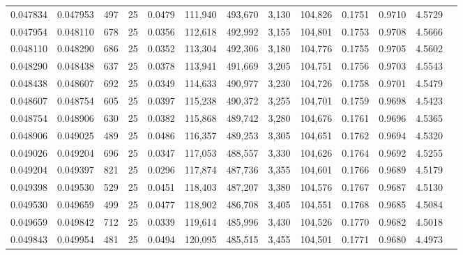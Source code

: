 \begin{tabular}{rrrrrrrrrrrrr}
0.047834 & 0.047953 &   497 &  25 &                                     0.0479 & 111,940 & 493,670 &   3,130 & 104,826 & 0.1751 & 0.9710 & 4.5729 \\
0.047954 & 0.048110 &   678 &  25 &                                     0.0356 & 112,618 & 492,992 &   3,155 & 104,801 & 0.1753 & 0.9708 & 4.5666 \\
0.048110 & 0.048290 &   686 &  25 &                                     0.0352 & 113,304 & 492,306 &   3,180 & 104,776 & 0.1755 & 0.9705 & 4.5602 \\
0.048290 & 0.048438 &   637 &  25 &                                     0.0378 & 113,941 & 491,669 &   3,205 & 104,751 & 0.1756 & 0.9703 & 4.5543 \\
0.048438 & 0.048607 &   692 &  25 &                                     0.0349 & 114,633 & 490,977 &   3,230 & 104,726 & 0.1758 & 0.9701 & 4.5479 \\
0.048607 & 0.048754 &   605 &  25 &                                     0.0397 & 115,238 & 490,372 &   3,255 & 104,701 & 0.1759 & 0.9698 & 4.5423 \\
0.048754 & 0.048906 &   630 &  25 &                                     0.0382 & 115,868 & 489,742 &   3,280 & 104,676 & 0.1761 & 0.9696 & 4.5365 \\
0.048906 & 0.049025 &   489 &  25 &                                     0.0486 & 116,357 & 489,253 &   3,305 & 104,651 & 0.1762 & 0.9694 & 4.5320 \\
0.049026 & 0.049204 &   696 &  25 &                                     0.0347 & 117,053 & 488,557 &   3,330 & 104,626 & 0.1764 & 0.9692 & 4.5255 \\
0.049204 & 0.049397 &   821 &  25 &                                     0.0296 & 117,874 & 487,736 &   3,355 & 104,601 & 0.1766 & 0.9689 & 4.5179 \\
0.049398 & 0.049530 &   529 &  25 &                                     0.0451 & 118,403 & 487,207 &   3,380 & 104,576 & 0.1767 & 0.9687 & 4.5130 \\
0.049530 & 0.049659 &   499 &  25 &                                     0.0477 & 118,902 & 486,708 &   3,405 & 104,551 & 0.1768 & 0.9685 & 4.5084 \\
0.049659 & 0.049842 &   712 &  25 &                                     0.0339 & 119,614 & 485,996 &   3,430 & 104,526 & 0.1770 & 0.9682 & 4.5018 \\
0.049843 & 0.049954 &   481 &  25 &                                     0.0494 & 120,095 & 485,515 &   3,455 & 104,501 & 0.1771 & 0.9680 & 4.4973 \\

\end{tabular}
